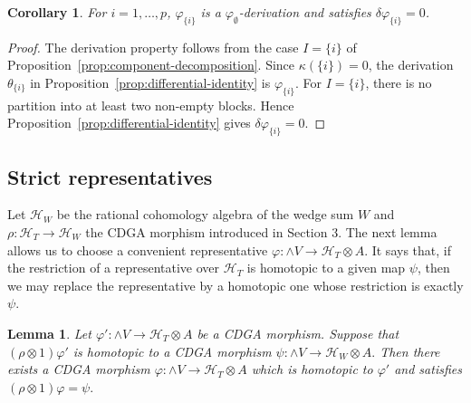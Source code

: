 \documentclass[a4paper,10pt]{amsart}
\newtheorem{lem}[thm]{Lemma}
\newtheorem{cor}[thm]{Corollary}
\theoremstyle{definition}
\theoremstyle{remark}
\numberwithin{equation}{section}
\begin{document}
\begin{cor}\label{cor:single-component}
For $i=1,\ldots,p$, $\varphi_{\{i\}}$ is a
$\varphi_{\emptyset}$-derivation and satisfies
$\delta\varphi_{\{i\}}=0$.
\end{cor}

\begin{proof}
The derivation property follows from the case $I=\{i\}$ of
Proposition~\ref{prop:component-decomposition}. Since $\kappa(\{i\})=0$, the
derivation $\theta_{\{i\}}$ in Proposition~\ref{prop:differential-identity} is
$\varphi_{\{i\}}$. For $I=\{i\}$, there is no partition into at least two
non-empty blocks. Hence Proposition~\ref{prop:differential-identity} gives
$\delta\varphi_{\{i\}}=0$.
\end{proof}



\subsection{Strict representatives}

Let $\mathcal H_W$ be the rational cohomology algebra of the wedge sum $W$ and
$
\rho:\mathcal H_T\to \mathcal H_W
$
the CDGA morphism introduced in Section 3.
The next lemma allows us to choose a convenient representative
$
\varphi:\wedge V\to \mathcal H_T\otimes A.
$
It says that, if the restriction of a representative over $\mathcal H_T$ is
homotopic to a given map $\psi$, then we may replace the representative by a
homotopic one whose restriction is exactly $\psi$.

\begin{lem}\label{lem:strict-cohomology-model}
Let $\varphi':\wedge V\to \mathcal H_T\otimes A$ be a CDGA morphism.
Suppose that $(\rho\otimes 1)\varphi'$ is homotopic to a CDGA morphism
$
\psi:\wedge V\to \mathcal H_W\otimes A.
$
Then there exists a CDGA morphism
$
\varphi:\wedge V\to \mathcal H_T\otimes A
$
which is homotopic to $\varphi'$ and satisfies
$
(\rho\otimes 1)\varphi=\psi.
$
\end{lem}
\end{document}
